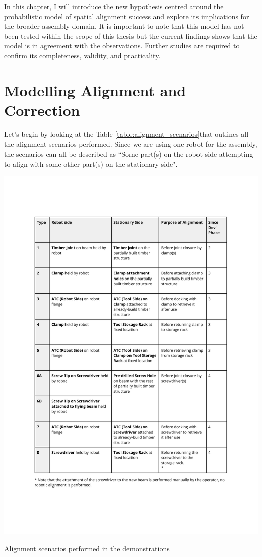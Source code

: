 In this chapter, I will introduce the new hypothesis centred around the probabilistic model of spatial alignment success and explore its implications for the broader assembly domain. It is important to note that this model has not been tested within the scope of this thesis but the current findings shows that the model is in agreement with the observations. Further studies are required to confirm its completeness, validity, and practicality. 

\section{Modelling Alignment and Correction}

Let's begin by looking at the Table \ref{table:alignment_scenarios}that outlines all the alignment scenarios performed. Since we are using one robot for the assembly, the scenarios can all be described as ``Some part(s) on the robot-side attempting to align with some other part(s) on the stationary-side". 

\begin{table}
    \includegraphics[page=1, trim=25.4mm 35mm 25.4mm 33mm, clip, width=\textwidth]{tables/Tables in Chapter 9 to 11.pdf}
    \caption{Alignment scenarios performed in the demonstrations}
    \label{table:alignment_scenarios}
\end{table}

